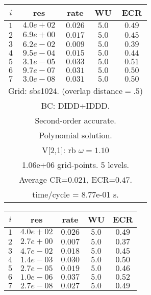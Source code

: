 \begin{table}[hbt]
\begin{center}
{\qquad %
\begin{tabular}{|c|c|c|c|c|} \hline 
 $i$   & res      & rate    &  WU    & ECR  \\   \hline 
 $ 1$  & $ 4.0e+02$ & $0.026$ & $ 5.0$ & $0.49$ \\ 
 $ 2$  & $ 6.9e+00$ & $0.017$ & $ 5.0$ & $0.45$ \\ 
 $ 3$  & $ 6.2e-02$ & $0.009$ & $ 5.0$ & $0.39$ \\ 
 $ 4$  & $ 9.5e-04$ & $0.015$ & $ 5.0$ & $0.44$ \\ 
 $ 5$  & $ 3.1e-05$ & $0.033$ & $ 5.0$ & $0.51$ \\ 
 $ 6$  & $ 9.7e-07$ & $0.031$ & $ 5.0$ & $0.50$ \\ 
 $ 7$  & $ 3.0e-08$ & $0.031$ & $ 5.0$ & $0.50$ \\ 
\hline 
\multicolumn{5}{|c|}{Grid: sbs1024. (overlap distance$=.5$)}  \\
\multicolumn{5}{|c|}{BC: DIDD+IDDD.}  \\
\multicolumn{5}{|c|}{Second-order accurate.}  \\
\multicolumn{5}{|c|}{Polynomial solution.}  \\
\multicolumn{5}{|c|}{V[2,1]: rb $\omega=1.10$}  \\
\multicolumn{5}{|c|}{1.06e+06 grid-points. 5 levels.}  \\
\multicolumn{5}{|c|}{Average CR=$0.021$, ECR=$0.47$.}  \\
\multicolumn{5}{|c|}{time/cycle = 8.77e-01 s.}  \\
\hline 
\end{tabular}
\qquad %
\begin{tabular}{|c|c|c|c|c|} \hline 
 $i$   & res      & rate    &  WU    & ECR  \\   \hline 
 $ 1$  & $ 4.0e+02$ & $0.026$ & $ 5.0$ & $0.49$ \\ 
 $ 2$  & $ 2.7e+00$ & $0.007$ & $ 5.0$ & $0.37$ \\ 
 $ 3$  & $ 4.7e-02$ & $0.018$ & $ 5.0$ & $0.45$ \\ 
 $ 4$  & $ 1.4e-03$ & $0.030$ & $ 5.0$ & $0.50$ \\ 
 $ 5$  & $ 2.7e-05$ & $0.019$ & $ 5.0$ & $0.46$ \\ 
 $ 6$  & $ 1.0e-06$ & $0.037$ & $ 5.0$ & $0.52$ \\ 
 $ 7$  & $ 2.7e-08$ & $0.027$ & $ 5.0$ & $0.49$ \\ 

\end{tabular}}
\end{center}
\end{table}
